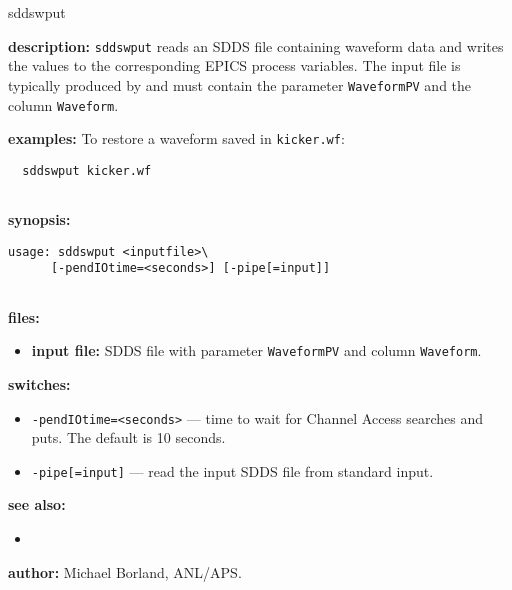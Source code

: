 \begin{sddsprog}{sddswput}
\item \textbf{description:}
  \verb+sddswput+ reads an SDDS file containing waveform data and writes the
  values to the corresponding EPICS process variables.  The input file is
  typically produced by  and must contain the parameter
  \verb|WaveformPV| and the column \verb|Waveform|.

\item \textbf{examples:}
  To restore a waveform saved in \verb|kicker.wf|:
  \begin{verbatim}
  sddswput kicker.wf
  
\end{verbatim}

\item \textbf{synopsis:}
  \begin{verbatim}
usage: sddswput <inputfile>\
      [-pendIOtime=<seconds>] [-pipe[=input]]
  
\end{verbatim}

\item \textbf{files:}
\begin{itemize}
  \item \textbf{input file:} SDDS file with parameter \verb|WaveformPV| and column \verb|Waveform|.
\end{itemize}

\item \textbf{switches:}
\begin{itemize}
  \item {\tt -pendIOtime=<seconds>} --- time to wait for Channel Access searches and puts. The default is 10 seconds.
  \item {\tt -pipe[=input]} --- read the input SDDS file from standard input.
\end{itemize}

\item \textbf{see also:}
\begin{itemize}
  \item {}
\end{itemize}

\item \textbf{author:} Michael Borland, ANL/APS.
\end{sddsprog}
